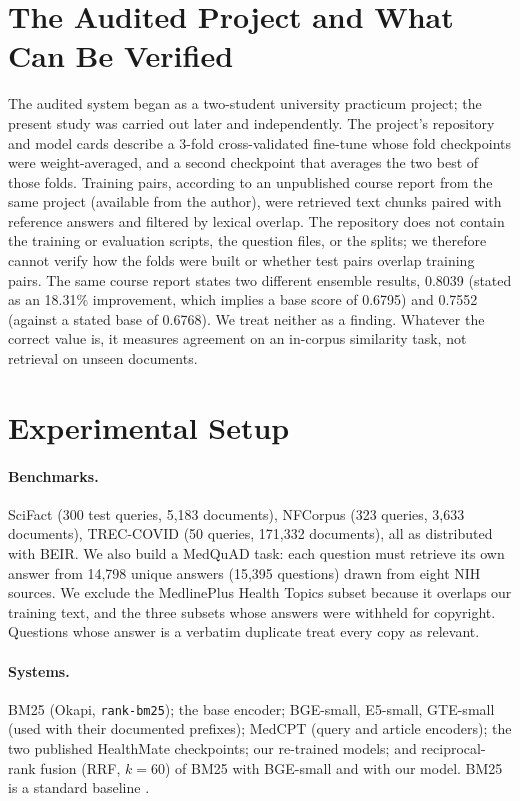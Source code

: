 \documentclass[11pt]{article}
\begin{document}
\section{The Audited Project and What Can Be Verified}\label{sec:audit}
The audited system began as a two-student university practicum project; the present study was carried out later and independently. The project's repository and model cards describe a 3-fold cross-validated fine-tune whose fold checkpoints were weight-averaged, and a second checkpoint that averages the two best of those folds. Training pairs, according to an unpublished course report from the same project (available from the author), were retrieved text chunks paired with reference answers and filtered by lexical overlap. The repository does not contain the training or evaluation scripts, the question files, or the splits; we therefore cannot verify how the folds were built or whether test pairs overlap training pairs. The same course report states two different ensemble results, 0.8039 (stated as an 18.31\% improvement, which implies a base score of 0.6795) and 0.7552 (against a stated base of 0.6768). We treat neither as a finding. Whatever the correct value is, it measures agreement on an in-corpus similarity task, not retrieval on unseen documents.

\section{Experimental Setup}
\paragraph{Benchmarks.} SciFact (300 test queries, 5,183 documents), NFCorpus (323 queries, 3,633 documents), TREC-COVID (50 queries, 171,332 documents), all as distributed with BEIR. We also build a MedQuAD \citep{benabacha2019medquad} task: each question must retrieve its own answer from 14,798 unique answers (15,395 questions) drawn from eight NIH sources. We exclude the MedlinePlus Health Topics subset because it overlaps our training text, and the three subsets whose answers were withheld for copyright. Questions whose answer is a verbatim duplicate treat every copy as relevant.

\paragraph{Systems.} BM25 (Okapi, \texttt{rank-bm25}); the base encoder; BGE-small, E5-small, GTE-small (used with their documented prefixes); MedCPT (query and article encoders); the two published HealthMate checkpoints; our re-trained models; and reciprocal-rank fusion (RRF, $k{=}60$) \citep{cormack2009rrf} of BM25 with BGE-small and with our model. BM25 is a standard baseline \citep{robertson2009bm25}.
\end{document}
